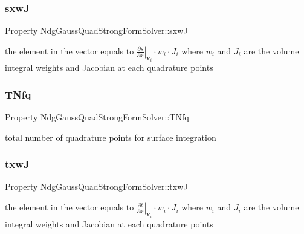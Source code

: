 \subsubsection{\texorpdfstring{sxwJ}{sxwJ}}
{\footnotesize\ttfamily Property Ndg\+Gauss\+Quad\+Strong\+Form\+Solver\+::sxwJ}

the element in the vector equals to $ \left. \frac{\partial s}{\partial x} \right|_{\mathbf{x}_i} \cdot w_i \cdot J_i $ where $ w_i $ and $ J_i $ are the volume integral weights and Jacobian at each quadrature points \mbox{\label{class_ndg_gauss_quad_strong_form_solver_addd134051c5bdd3a93939e5cb7bacaf3}} 
\subsubsection{\texorpdfstring{T\+Nfq}{TNfq}}
{\footnotesize\ttfamily Property Ndg\+Gauss\+Quad\+Strong\+Form\+Solver\+::\+T\+Nfq}



total number of quadrature points for surface integration 

\mbox{\label{class_ndg_gauss_quad_strong_form_solver_ad6c758963ce377b88b0525a479e07ec0}} 
\subsubsection{\texorpdfstring{txwJ}{txwJ}}
{\footnotesize\ttfamily Property Ndg\+Gauss\+Quad\+Strong\+Form\+Solver\+::txwJ}

the element in the vector equals to $ \left. \frac{\partial t}{\partial x} \right|_{\mathbf{x}_i} \cdot w_i \cdot J_i $ where $ w_i $ and $ J_i $ are the volume integral weights and Jacobian at each quadrature points \mbox{\label{class_ndg_gauss_quad_strong_form_solver_a4ce60f505d4197514449c0ceef7ce90c}} 
